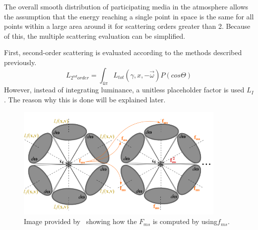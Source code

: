 \documentclass{ctuthesis}
\begin{document}
The overall smooth distribution of participating media in the atmosphere allows the assumption
that the energy reaching a single point in space is the same for all points within a large area
around it for scattering orders greater than 2. Because of this, the multiple scattering
evaluation can be simplified.

First, second-order scattering is evaluated according to the methods described previously.
\begin{equation}
    L_{2^{nd}order} = \int_{4 \pi} L_{tot}(\gamma, x, -\overrightarrow{\omega}) P(cos \Theta)
\end{equation}
However, instead of integrating luminance, a unitless placeholder factor is used $L_{I}$.
The reason why this is done will be explained later.

\begin{figure}
    \includegraphics[width=0.9\textwidth]{media/Hillaire_multiscattering.png}
    \caption[$F_{ms}$ and $f_{ms}$ by~\cite{hillaire_2020}]{Image provided by~\cite{hillaire_2020} showing how the
         $F_{ms}$ is computed by using$f_{ms}$.}
\end{figure}
\end{document}
